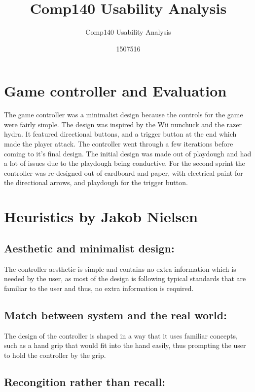 \documentclass{scrartcl}
\title{Comp140 Usability Analysis}
\subtitle{Comp140 Usability Analysis}
\author{1507516}
\begin{document}
\maketitle

\abstract{}

\section{Game controller and Evaluation}

The game controller was a minimalist design because the controls for the game were fairly simple. The design was inspired by the Wii nunchuck and the razer hydra. It featured directional buttons, and a trigger button at the end which made the player attack. The controller went through a few iterations before coming to it's final design. The initial design was made out of playdough and had a lot of issues due to the playdough being conductive. For the second sprint the controller was re-designed out of cardboard and paper, with electrical paint for the directional arrows, and playdough for the trigger button.





\section{Heuristics by Jakob Nielsen\cite{nielsen1990heuristic}}
\subsection{Aesthetic and minimalist design:}

The controller aesthetic is simple and contains no extra information which is needed by the user, as most of the design is following typical standards that are familiar to the user and thus, no extra information is required. 

\subsection{Match between system and the real world:}

The design of the controller is shaped in a way that it uses familiar concepts, such as a hand grip that would fit into the hand easily, thus prompting the user to hold the controller by the grip.

\subsection{Recongition rather than recall:}
\end{document}
